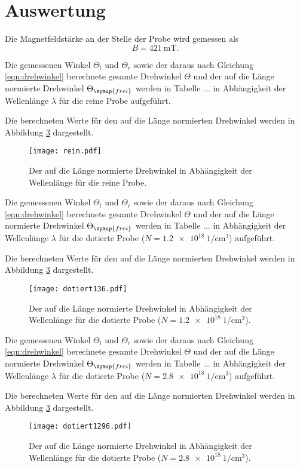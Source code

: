 \section{Auswertung}
\label{sec:Auswertung}

Die Magnetfeldstärke an der Stelle der Probe wird gemessen als
\begin{equation*}
  B = \SI{421}{\milli\tesla}.
\end{equation*}

Die gemessenen Winkel $\Theta_l$ und $\Theta_r$ sowie der daraus nach Gleichung
\ref{eqn:drehwinkel} berechnete gesamte Drehwinkel $\Theta$ und der auf die Länge
normierte Drehwinkel $\Theta_\symup{frei}$ werden in Tabelle ... in Abhängigkeit
der Wellenlänge $\lambda$ für die reine Probe aufgeführt.

Die berechneten Werte für den auf die Länge normierten Drehwinkel werden
in Abbildung \ref{fig:rein} dargestellt.
\begin{figure}[H]
  \centering
  \texttt{[image: rein.pdf]}
  \caption{Der auf die Länge normierte Drehwinkel in Abhängigkeit der Wellenlänge für die reine Probe.}
  \label{fig:rein}
\end{figure}

Die gemessenen Winkel $\Theta_l$ und $\Theta_r$ sowie der daraus nach Gleichung
\ref{eqn:drehwinkel} berechnete gesamte Drehwinkel $\Theta$ und der auf die Länge
normierte Drehwinkel $\Theta_\symup{frei}$ werden in Tabelle ... in Abhängigkeit
der Wellenlänge $\lambda$ für die dotierte Probe ($N = \SI{1.2e18}{1\per\centi\meter^3}$) aufgeführt.

Die berechneten Werte für den auf die Länge normierten Drehwinkel werden
in Abbildung \ref{fig:rein} dargestellt.
\begin{figure}[H]
  \centering
  \texttt{[image: dotiert136.pdf]}
  \caption{Der auf die Länge normierte Drehwinkel in Abhängigkeit der Wellenlänge für die dotierte Probe ($N = \SI{1.2e18}{1\per\centi\meter^3}$).}
  \label{fig:rein}
\end{figure}

Die gemessenen Winkel $\Theta_l$ und $\Theta_r$ sowie der daraus nach Gleichung
\ref{eqn:drehwinkel} berechnete gesamte Drehwinkel $\Theta$ und der auf die Länge
normierte Drehwinkel $\Theta_\symup{frei}$ werden in Tabelle ... in Abhängigkeit
der Wellenlänge $\lambda$ für die dotierte Probe ($N = \SI{2.8e18}{1\per\centi\meter^3}$) aufgeführt.

Die berechneten Werte für den auf die Länge normierten Drehwinkel werden
in Abbildung \ref{fig:rein} dargestellt.
\begin{figure}[H]
  \centering
  \texttt{[image: dotiert1296.pdf]}
  \caption{Der auf die Länge normierte Drehwinkel in Abhängigkeit der Wellenlänge für die dotierte Probe ($N = \SI{2.8e18}{1\per\centi\meter^3}$).}
  \label{fig:rein}
\end{figure}

